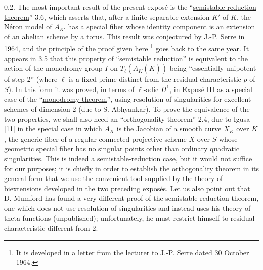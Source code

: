 0.2. The most important result of the present expos\'e is the
``\underline{semistable reduction theorem}'' 3.6, which asserts that,
after a finite separable extension $K'$ of $K$, the N\'eron model of
$A_{K'}$ has a special fiber whose identity component is an extension
of an abelian scheme by a torus. This result was conjectured by
J.-P. Serre in 1964, and the principle of the proof given here
\footnote{It is developed in a letter from the lecturer to J.-P. Serre
dated 30 October 1964.}
goes back to the same year. It appears in 3.5 that this property of
``semistable reduction'' is equivalent to the action of the monodromy
group $I$ on $T_\ell(A_K(\overline K))$ being ``essentially unipotent
of step 2'' (where $\ell$ is a fixed prime distinct from the residual
characteristic $p$ of $S$). In this form it was proved, in terms of
$\ell$-adic $H^1$, in Expos\'e III as a special case of the
``\underline{monodromy theorem}'', using resolution of singularities
for excellent schemes of dimension $2$ (due to S. Abhyankar). To prove
the equivalence of the two properties, we shall also need an
``orthogonality theorem'' 2.4, due to Igusa [11] in the special case in
which $A_K$ is the Jacobian of a smooth curve $X_K$ over $K$, the
generic fiber of a regular connected projective scheme $X$ over $S$
whose geometric special fiber has no singular points other than
ordinary quadratic singularities. This is indeed a semistable-reduction
case, but it would not suffice for our purposes; it is chiefly in order
to establish the orthogonality theorem in its general form that we use
the convenient tool supplied by the theory of biextensions developed
in the two preceding expos\'es. Let us also point out that D. Mumford
has found a very different proof of the semistable reduction theorem,
one which does not use resolution of singularities and instead uses
his theory of theta functions (unpublished); unfortunately, he must
restrict himself to residual characteristic different from $2$.

